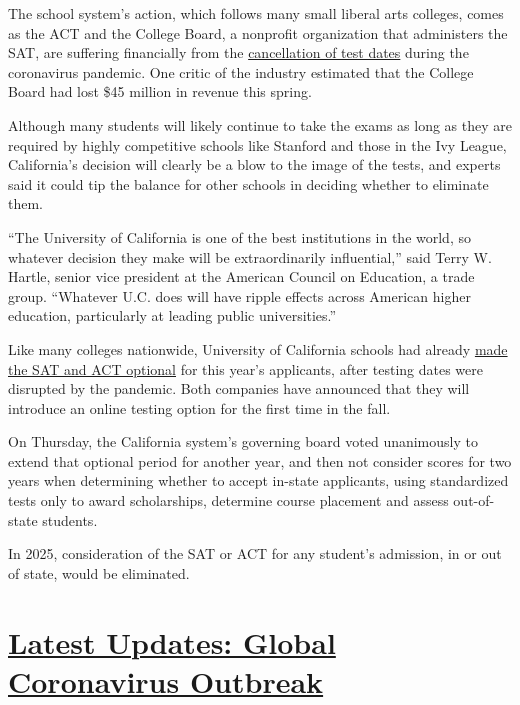 The school system's action, which follows many small liberal arts
colleges, comes as the ACT and the College Board, a nonprofit
organization that administers the SAT, are suffering financially from
the
\href{https://www.nytimes.com/2020/04/15/us/sat-act-test-coronavirus.html}{cancellation
of test dates} during the coronavirus pandemic. One critic of the
industry estimated that the College Board had lost \$45 million in
revenue this spring.

Although many students will likely continue to take the exams as long as
they are required by highly competitive schools like Stanford and those
in the Ivy League, California's decision will clearly be a blow to the
image of the tests, and experts said it could tip the balance for other
schools in deciding whether to eliminate them.

``The University of California is one of the best institutions in the
world, so whatever decision they make will be extraordinarily
influential,'' said Terry W. Hartle, senior vice president at the
American Council on Education, a trade group. ``Whatever U.C. does will
have ripple effects across American higher education, particularly at
leading public universities.''

Like many colleges nationwide, University of California schools had
already
\href{https://www.nytimes.com/article/sat-act-test-optional-colleges-coronavirus.html}{made
the SAT and ACT optional} for this year's applicants, after testing
dates were disrupted by the pandemic. Both companies have announced that
they will introduce an online testing option for the first time in the
fall.

On Thursday, the California system's governing board voted unanimously
to extend that optional period for another year, and then not consider
scores for two years when determining whether to accept in-state
applicants, using standardized tests only to award scholarships,
determine course placement and assess out-of-state students.

In 2025, consideration of the SAT or ACT for any student's admission, in
or out of state, would be eliminated.

\hypertarget{latest-updates-global-coronavirus-outbreak}{%
\section{\texorpdfstring{\href{https://www.nytimes.com/2020/08/01/world/coronavirus-covid-19.html?action=click\&pgtype=Article\&state=default\&region=MAIN_CONTENT_1\&context=storylines_live_updates}{Latest
Updates: Global Coronavirus
Outbreak}}{Latest Updates: Global Coronavirus Outbreak}}\label{latest-updates-global-coronavirus-outbreak}}

